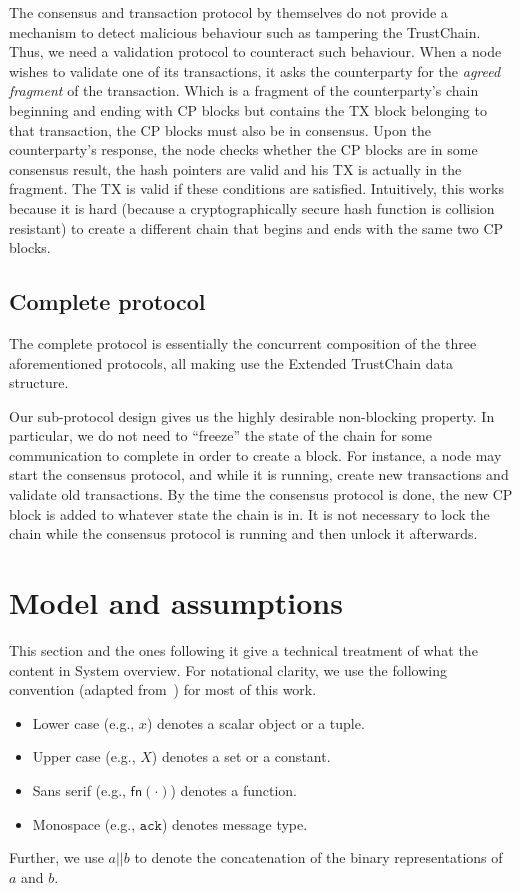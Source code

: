 The consensus and transaction protocol by themselves do not provide a mechanism to detect malicious behaviour such as tampering the TrustChain.
Thus, we need a validation protocol to counteract such behaviour.
When a node wishes to validate one of its transactions, it asks the counterparty for the \emph{agreed fragment} of the transaction.
Which is a fragment of the counterparty's chain beginning and ending with CP blocks but contains the TX block belonging to that transaction,
the CP blocks must also be in consensus.
Upon the counterparty's response, the node checks whether the CP blocks are in some consensus result,
the hash pointers are valid and his TX is actually in the fragment.
The TX is valid if these conditions are satisfied.
Intuitively, this works because it is hard (because a cryptographically secure hash function is collision resistant)
to create a different chain that begins and ends with the same two CP blocks.


\subsection*{Complete protocol}
The complete protocol is essentially the concurrent composition of the three aforementioned protocols,
all making use the Extended TrustChain data structure.

Our sub-protocol design gives us the highly desirable non-blocking property.
In particular, we do not need to ``freeze'' the state of the chain for some communication to complete in order to create a block.
For instance, a node may start the consensus protocol, and while it is running, create new transactions and validate old transactions.
By the time the consensus protocol is done, the new CP block is added to whatever state the chain is in.
It is not necessary to lock the chain while the consensus protocol is running and then unlock it afterwards.

\section{Model and assumptions}
\label{sec:model-assumptions}

This section and the ones following it give a technical treatment of what the content in System overview.
For notational clarity, we use the following convention (adapted from~\cite{miller2016honey}) for most of this work.
\begin{itemize}
\item Lower case (e.g., $x$) denotes a scalar object or a tuple.
\item Upper case (e.g., $X$) denotes a set or a constant.
\item Sans serif (e.g., $\textsf{fn}(\cdot)$) denotes a function.
\item Monospace (e.g., $\texttt{ack}$) denotes message type.
\end{itemize}
Further, we use $a || b$ to denote the concatenation of the binary representations of $a$ and $b$.

